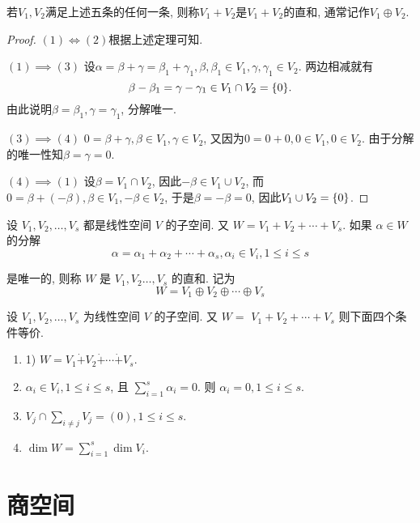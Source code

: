 \documentclass{ctexart}
\begin{document}
若$V_{1},V_{2}$满足上述五条的任何一条, 则称$V_{1}+V_{2}$是$V_{1}+V_{2}$的直和, 通常记作$V_{1}\oplus V_{2}$.

\begin{proof}
    $(1)\iff (2)$根据上述定理可知. 

    $(1)\implies (3)$ 设$\alpha=\beta+\gamma=\beta_1+\gamma_1,\beta,\beta_1\in V_1,\gamma,\gamma_1\in V_2$. 两边相减就有
    \[
        \beta-\beta_1=\gamma-\gamma_1\in V_1\cap V_2=\{0\}.
    \]
    由此说明$\beta=\beta_1,\gamma=\gamma_1$, 分解唯一. 

    $(3)\implies (4)$ $0=\beta+\gamma,\beta\in V_1, \gamma\in V_2$, 又因为$0=0+0,0\in V_1,0\in V_2$. 由于分解的唯一性知$\beta=\gamma=0$.

    $(4)\implies (1)$ 设$\beta=V_1\cap V_2$, 因此$-\beta\in V_1\cup V_2$, 而$0=\beta+(-\beta), \beta\in V_1, -\beta\in V_2$, 于是$\beta=-\beta=0$, 因此$V_1\cup V_2=\{0\}$. 



\end{proof}

\begin{definition}[直和]
    设 $V_1, V_2, \ldots, V_s$ 都是线性空间 $V$ 的子空间. 又 $W=V_1+V_2+\cdots+V_s$. 如果 $\alpha \in W$ 的分解
$$
\alpha=\alpha_1+\alpha_2+\cdots+\alpha_s, \alpha_i \in V_i, 1 \leq i \leq s
$$

是唯一的, 则称 $W$ 是 $V_1, V_2 \ldots, V_s$ 的直和. 记为
$$
W=V_1 \oplus V_2 \oplus \cdots \oplus V_s
$$
\end{definition}

\begin{theorem}
     设 $V_1, V_2, \ldots, V_s$ 为线性空间 $V$ 的子空间. 又 $W=$ $V_1+V_2+\cdots+V_s$ 则下面四个条件等价.
     \begin{enumerate}
         \item 1) $W=V_1 \dot{+} V_2 \dot{+} \cdots \dot{+} V_s$.
         \item $\alpha_i \in V_i, 1 \leq i \leq s$, 且 $\sum_{i=1}^s \alpha_i=0$. 则 $\alpha_i=0,1 \leq i \leq s$.
         \item $V_j \cap \sum_{i \neq j} V_j=(0), 1 \leq i \leq s$.
         \item  $\operatorname{dim} W=\sum_{i=1}^s \operatorname{dim} V_i$.
     \end{enumerate}
\end{theorem}

\section{商空间}
\end{document}
